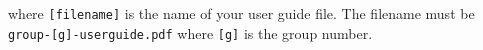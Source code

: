 \documentclass{article}
\begin{document}




where \verb|[filename]| is the name of your user guide file. The filename must be  \verb|group-[g]-userguide.pdf| where \verb|[g]| is the group number.




\end{document}
